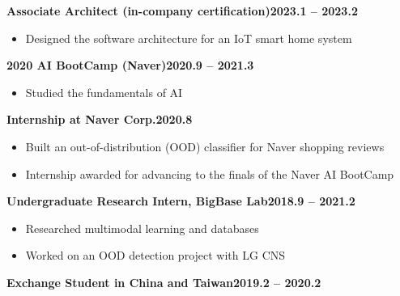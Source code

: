 \documentclass[10pt,a4paper]{article}
\newcommand{\entry}[2]{\par\noindent#1\hfill#2\par}
\newcommand{\titled}[2]{\par\vspace{3pt}\entry{\textbf{#1}}{\textbf{#2}}}
\begin{document}
\titled{Associate Architect (in-company certification)}{2023.1 -- 2023.2}
\begin{itemize}
  \item Designed the software architecture for an IoT smart home system
\end{itemize}

\titled{2020 AI BootCamp (Naver)}{2020.9 -- 2021.3}
\begin{itemize}
  \item Studied the fundamentals of AI
\end{itemize}

\titled{Internship at Naver Corp.}{2020.8}
\begin{itemize}
  \item Built an out-of-distribution (OOD) classifier for Naver shopping reviews
  \item Internship awarded for advancing to the finals of the Naver AI BootCamp
\end{itemize}

\titled{Undergraduate Research Intern, BigBase Lab}{2018.9 -- 2021.2}
\begin{itemize}
  \item Researched multimodal learning and databases
  \item Worked on an OOD detection project with LG CNS
\end{itemize}

\titled{Exchange Student in China and Taiwan}{2019.2 -- 2020.2}
\end{document}

